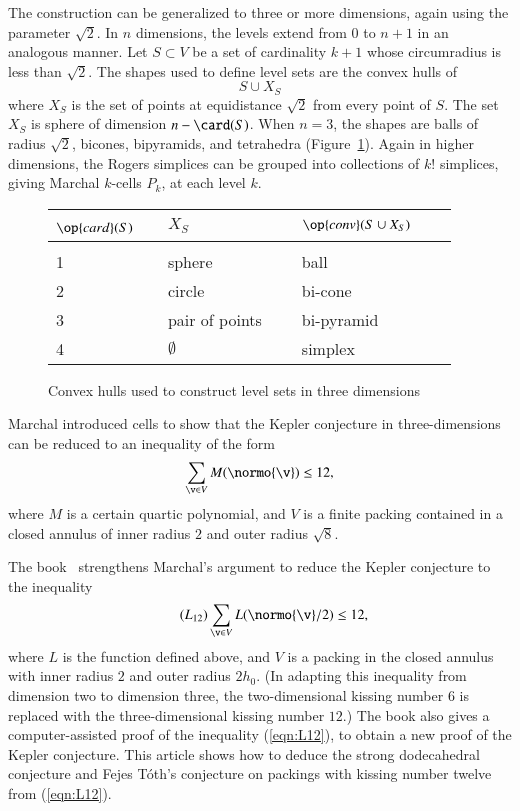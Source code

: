 \documentclass{llncs}
\begin{document}
The construction can be generalized to three or more dimensions,
again using the parameter $\sqrt2$.   In $n$ dimensions, the levels extend
from $0$ to $n+1$ in an analogous manner.  Let $S\subset V$ be a set of
cardinality $k+1$ whose circumradius is less than $\sqrt2$.
The shapes used to define level sets are the convex hulls of
\[
S \cup X_S
\]
where $X_S$ is the set of points at equidistance $\sqrt2$ from every
point of $S$. The set $X_S$ is sphere of dimension $n-\card(S)$. 
When $n=3$, the shapes are balls of radius $\sqrt2$,
bicones, bipyramids, and tetrahedra (Figure~\ref{fig:table}).  Again
in higher dimensions, the Rogers simplices can be grouped into
collections of $k!$ simplices, giving Marchal $k$-cells $P_k$, at each
level $k$.

\begin{figure}[h!]
\centering
\begin{tabular}{l l l l l}
\hline
$\op{card}(S)$~~ &$X_S$  
&$\op{conv}(S\cup X_S)$\\ [0.5ex]
\hline \\
1 &sphere& ball\\
2& circle& bi-cone\\
3& pair of points~~~& bi-pyramid\\
4& $\emptyset$ & simplex\\
 [1ex]
\hline
\end{tabular}
\caption{Convex hulls used to construct level sets in three dimensions}
\label{fig:table}
\end{figure}


\begin{remark} Marchal introduced cells to show that the Kepler
  conjecture in three-dimensions can be reduced to an inequality of
  the form
\[
\sum_{\v\in V} M(\normo{\v}) \le 12,
\]
where $M$ is a certain quartic polynomial, and $V$ is a finite packing 
contained in a closed annulus of inner radius $2$ and outer
radius $\sqrt8$.  
\end{remark}

\begin{remark}
The book~\cite{DSP} strengthens Marchal's argument to reduce
the Kepler conjecture to the inequality
\begin{equation}\label{eqn:L12}\tag{$L_{12}$}
\sum_{\v \in V} L(\normo{\v}/2) \le 12,
\end{equation}
where $L$ is the function defined above, and $V$ is a packing in the
closed annulus with inner radius $2$ and outer radius $2h_0$.  (In
adapting this inequality from dimension two to dimension three, the
two-dimensional kissing number $6$ is replaced with the
three-dimensional kissing number $12$.) The book also gives a
computer-assisted proof of the inequality (\ref{eqn:L12}), to obtain a
new proof of the Kepler conjecture.  This article shows how to deduce
the strong dodecahedral conjecture and Fejes T\'oth's 
conjecture on packings with kissing number twelve from (\ref{eqn:L12}).
\end{remark}
\end{document}
